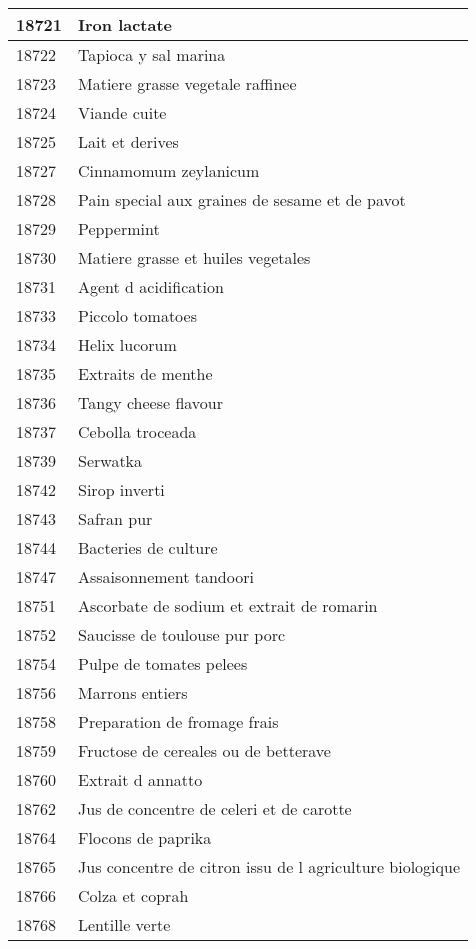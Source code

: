 \begin{longtable}{|l|l|}
18721 & Iron lactate \\ \hline 
18722 & Tapioca y sal marina \\ \hline 
18723 & Matiere grasse vegetale raffinee \\ \hline 
18724 & Viande cuite \\ \hline 
18725 & Lait et derives \\ \hline 
18727 & Cinnamomum zeylanicum \\ \hline 
18728 & Pain special aux graines de sesame et de pavot \\ \hline 
18729 & Peppermint \\ \hline 
18730 & Matiere grasse et huiles vegetales \\ \hline 
18731 & Agent d acidification \\ \hline 
18733 & Piccolo tomatoes \\ \hline 
18734 & Helix lucorum \\ \hline 
18735 & Extraits de menthe \\ \hline 
18736 & Tangy cheese flavour \\ \hline 
18737 & Cebolla troceada \\ \hline 
18739 & Serwatka \\ \hline 
18742 & Sirop inverti \\ \hline 
18743 & Safran pur \\ \hline 
18744 & Bacteries de culture \\ \hline 
18747 & Assaisonnement tandoori \\ \hline 
18751 & Ascorbate de sodium et extrait de romarin \\ \hline 
18752 & Saucisse de toulouse pur porc \\ \hline 
18754 & Pulpe de tomates pelees \\ \hline 
18756 & Marrons entiers \\ \hline 
18758 & Preparation de fromage frais \\ \hline 
18759 & Fructose de cereales ou de betterave \\ \hline 
18760 & Extrait d annatto \\ \hline 
18762 & Jus de concentre de celeri et de carotte \\ \hline 
18764 & Flocons de paprika \\ \hline 
18765 & Jus concentre de citron  issu de l agriculture biologique \\ \hline 
18766 & Colza et coprah \\ \hline 
18768 & Lentille verte \\ \hline 

\end{longtable}
